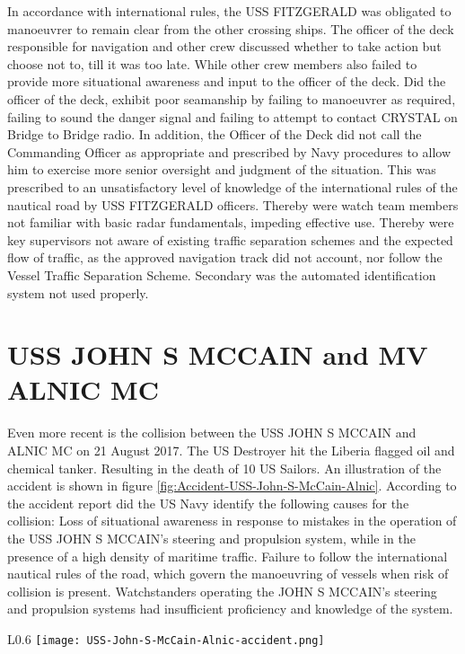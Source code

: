 In accordance with international rules, the USS FITZGERALD was obligated to manoeuvrer to remain clear from the other crossing ships. The officer of the deck responsible for navigation and other crew discussed whether to take action but choose not to, till it was too late. While other crew members also failed to provide more situational awareness and input to the officer of the deck. Did the officer of the deck, exhibit poor seamanship by failing to manoeuvrer as required, failing to sound the danger signal and failing to attempt to contact CRYSTAL on Bridge to Bridge radio. In addition, the Officer of the Deck did not call the Commanding Officer as appropriate and prescribed by Navy procedures to allow him to exercise more senior oversight and judgment of the situation. This was prescribed to an unsatisfactory level of knowledge of the international rules of the nautical road by USS FITZGERALD officers. Thereby were watch team members not familiar with basic radar fundamentals, impeding effective use. Thereby were key supervisors not aware of existing traffic separation schemes and the expected flow of traffic, as the approved navigation track did not account, nor follow the Vessel Traffic Separation Scheme. Secondary was the automated identification system not used properly. \cite{USNavy2017}

\newpage
\section{USS JOHN S MCCAIN and MV ALNIC MC}
Even more recent is the collision between the USS JOHN S MCCAIN and ALNIC MC on 21 August 2017. The US Destroyer hit the Liberia flagged oil and chemical tanker. Resulting in the death of 10  US Sailors. An illustration of the accident is shown in figure \ref{fig:Accident-USS-John-S-McCain-Alnic}. According to the accident report did the US Navy identify the following causes for the collision: Loss of situational awareness in response to mistakes in the operation of the USS JOHN S MCCAIN's steering and propulsion system, while in the presence of a high density of maritime traffic. Failure to follow the international nautical rules of the road, which govern the manoeuvring of vessels when risk of collision is present. Watchstanders operating the JOHN S MCCAIN's steering and propulsion systems had insufficient proficiency and knowledge of the system. 

\begin{wrapfigure}{L}{0.6\textwidth}
	\centering
	\texttt{[image: USS-John-S-McCain-Alnic-accident.png]}
	\caption{Illutstration map of approximate collision location}
	\label{fig:Accident-USS-John-S-McCain-Alnic}
\end{wrapfigure}

